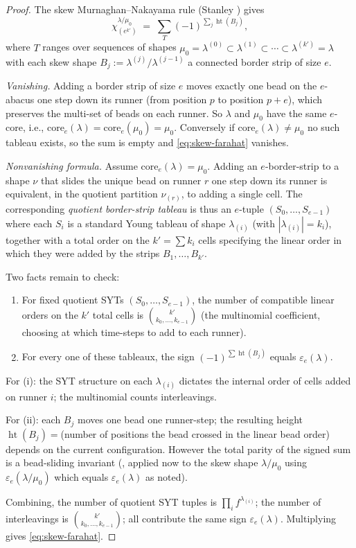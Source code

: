 \documentclass[11pt]{article}
\theoremstyle{definition}
\theoremstyle{remark}
\DeclareMathOperator{\hgt}{ht}
\newcommand{\core}{\mathrm{core}}
\begin{document}
\begin{proof}
The skew Murnaghan--Nakayama rule (Stanley \cite[Cor.~7.17.5]{Sta99}) gives
\[
  \chi^{\lambda/\mu_0}_{(e^{k'})}
  \;=\;
  \sum_{T}(-1)^{\sum_j\hgt(B_j)},
\]
where $T$ ranges over sequences of shapes
$\mu_0=\lambda^{(0)}\subset\lambda^{(1)}\subset\cdots\subset\lambda^{(k')}=\lambda$
with each skew shape $B_j:=\lambda^{(j)}/\lambda^{(j-1)}$ a connected border
strip of size $e$.

\smallskip\noindent\emph{Vanishing.}
Adding a border strip of size $e$ moves exactly one bead on the $e$-abacus
one step down its runner (from position $p$ to position $p+e$), which
preserves the multi-set of beads on each runner. So $\lambda$ and $\mu_0$
have the same $e$-core, i.e., $\core_e(\lambda)=\core_e(\mu_0)=\mu_0$.
Conversely if $\core_e(\lambda)\ne\mu_0$ no such tableau exists, so the sum
is empty and \eqref{eq:skew-farahat} vanishes.

\smallskip\noindent\emph{Nonvanishing formula.}
Assume $\core_e(\lambda)=\mu_0$. Adding an $e$-border-strip to a shape
$\nu$ that slides the unique bead on runner $r$ one step down its runner is
equivalent, in the quotient partition $\nu_{(r)}$, to adding a single cell.
The corresponding \emph{quotient border-strip tableau} is thus an $e$-tuple
$(S_0,\ldots,S_{e-1})$ where each $S_i$ is a standard Young tableau of shape
$\lambda_{(i)}$ (with $|\lambda_{(i)}|=k_i$), together with a total order on
the $k'=\sum k_i$ cells specifying the linear order in which they were added
by the strips $B_1,\ldots,B_{k'}$.

\smallskip
Two facts remain to check:
\begin{enumerate}
\item[(i)] For fixed quotient SYTs $(S_0,\ldots,S_{e-1})$, the number of
  compatible linear orders on the $k'$ total cells is
  $\binom{k'}{k_0,\ldots,k_{e-1}}$ (the multinomial coefficient, choosing at
  which time-steps to add to each runner).
\item[(ii)] For every one of these tableaux, the sign
  $(-1)^{\sum\hgt(B_j)}$ equals $\varepsilon_e(\lambda)$.
\end{enumerate}

For (i): the SYT structure on each $\lambda_{(i)}$ dictates the internal
order of cells added on runner $i$; the multinomial counts interleavings.

For (ii): each $B_j$ moves one bead one runner-step; the resulting height
$\hgt(B_j)=$(number of positions the bead crossed in the linear bead order)
depends on the current configuration. However the total parity of the
signed sum is a bead-sliding invariant (\cite[Thm.~2.7.32]{JK81}, applied
now to the skew shape $\lambda/\mu_0$ using $\varepsilon_e(\lambda/\mu_0)$
which equals $\varepsilon_e(\lambda)$ as noted).

Combining, the number of quotient SYT tuples is
$\prod_i f^{\lambda_{(i)}}$; the number of interleavings is
$\binom{k'}{k_0,\ldots,k_{e-1}}$; all contribute the same sign
$\varepsilon_e(\lambda)$. Multiplying gives \eqref{eq:skew-farahat}.
\end{proof}
\end{document}
